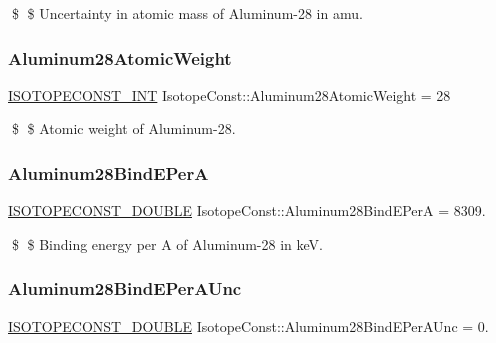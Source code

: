 \$ \$ Uncertainty in atomic mass of Aluminum-\/28 in amu. \mbox{\label{group___isotope_const-_aluminum-_al28_ga6fbf21a58d4e824bbaca6626f1a31e93}} 
\subsubsection{\texorpdfstring{Aluminum28\+Atomic\+Weight}{Aluminum28AtomicWeight}}
{\footnotesize\ttfamily \mbox{\hyperlink{group___isotope_const-_macros_ga5f18360b3e99483a35c32d789e62621c}{I\+S\+O\+T\+O\+P\+E\+C\+O\+N\+S\+T\+\_\+\+I\+NT}} Isotope\+Const\+::\+Aluminum28\+Atomic\+Weight = 28}

\$ \$ Atomic weight of Aluminum-\/28. \mbox{\label{group___isotope_const-_aluminum-_al28_ga7e5d3b5a5f25b8e726a5af84da766946}} 
\subsubsection{\texorpdfstring{Aluminum28\+Bind\+E\+PerA}{Aluminum28BindEPerA}}
{\footnotesize\ttfamily \mbox{\hyperlink{group___isotope_const-_macros_ga8f45a7272ce02c0b4c65c44636ed719a}{I\+S\+O\+T\+O\+P\+E\+C\+O\+N\+S\+T\+\_\+\+D\+O\+U\+B\+LE}} Isotope\+Const\+::\+Aluminum28\+Bind\+E\+PerA = 8309.}

\$ \$ Binding energy per A of Aluminum-\/28 in keV. \mbox{\label{group___isotope_const-_aluminum-_al28_ga47bc064c8d1d87d3c14fe8872bb7c747}} 
\subsubsection{\texorpdfstring{Aluminum28\+Bind\+E\+Per\+A\+Unc}{Aluminum28BindEPerAUnc}}
{\footnotesize\ttfamily \mbox{\hyperlink{group___isotope_const-_macros_ga8f45a7272ce02c0b4c65c44636ed719a}{I\+S\+O\+T\+O\+P\+E\+C\+O\+N\+S\+T\+\_\+\+D\+O\+U\+B\+LE}} Isotope\+Const\+::\+Aluminum28\+Bind\+E\+Per\+A\+Unc = 0.}

